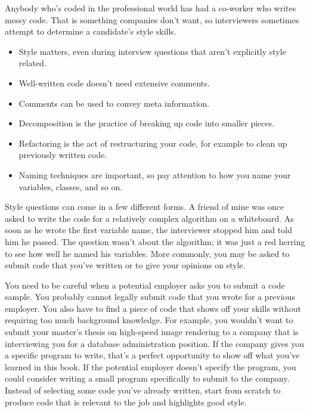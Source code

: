 
Anybody who’s coded in the professional world has had a co-worker who writes messy code. That is something companies don’t want, so interviewers sometimes attempt to determine a candidate’s style skills.


\begin{itemize}
\item
Style matters, even during interview questions that aren’t explicitly style related.

\item
Well-written code doesn’t need extensive comments.

\item
Comments can be used to convey meta information.

\item
Decomposition is the practice of breaking up code into smaller pieces.

\item
Refactoring is the act of restructuring your code, for example to clean up previously written code.

\item
Naming techniques are important, so pay attention to how you name your variables, classes, and so on.
\end{itemize}


Style questions can come in a few different forms. A friend of mine was once asked to write the code for a relatively complex algorithm on a whiteboard. As soon as he wrote the first variable name, the interviewer stopped him and told him he passed. The question wasn’t about the algorithm; it was just a red herring to see how well he named his variables. More commonly, you may be asked to submit code that you’ve written or to give your opinions on style.

You need to be careful when a potential employer asks you to submit a code sample. You probably cannot legally submit code that you wrote for a previous employer. You also have to find a piece of code that shows off your skills without requiring too much background knowledge. For example, you wouldn’t want to submit your master’s thesis on high-speed image rendering to a company that is interviewing you for a database administration position. If the company gives you a specific program to write, that’s a perfect opportunity to show off what you’ve learned in this book. If the potential employer doesn’t specify the program, you could consider writing a small program specifically to submit to the company. Instead of selecting some code you’ve already written, start from scratch to produce code that is relevant to the job and highlights good style.

